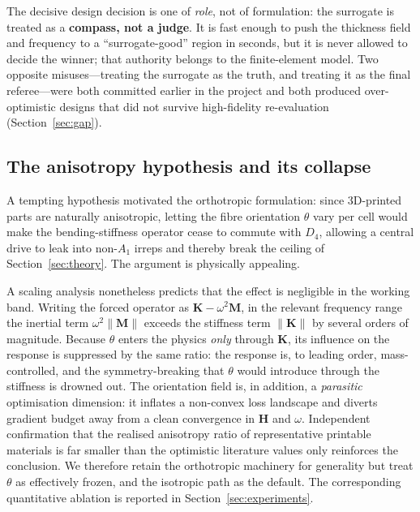 \documentclass[11pt,a4paper]{article}
\newcommand{\Aone}{A_1}
\newcommand{\Dfour}{D_4}
\newcommand{\matH}{\mathbf{H}}
\newcommand{\matK}{\mathbf{K}}
\newcommand{\matM}{\mathbf{M}}
\begin{document}
The decisive design decision is one of \emph{role}, not of formulation: the
surrogate is treated as a \textbf{compass, not a judge}. It is fast enough to push
the thickness field and frequency to a ``surrogate-good'' region in seconds, but
it is never allowed to decide the winner; that authority belongs to the
finite-element model. Two opposite misuses---treating the surrogate as the truth,
and treating it as the final referee---were both committed earlier in the project
and both produced over-optimistic designs that did not survive high-fidelity
re-evaluation (Section~\ref{sec:gap}).

\subsection{The anisotropy hypothesis and its collapse}\label{sec:aniso}
A tempting hypothesis motivated the orthotropic formulation: since 3D-printed
parts are naturally anisotropic, letting the fibre orientation $\theta$ vary per
cell would make the bending-stiffness operator cease to commute with $\Dfour$,
allowing a central drive to leak into non-$\Aone$ irreps and thereby break the
ceiling of Section~\ref{sec:theory}. The argument is physically appealing.

A scaling analysis nonetheless predicts that the effect is negligible in the
working band. Writing the forced operator as $\matK-\omega^2\matM$, in the
relevant frequency range the inertial term $\omega^2\lVert\matM\rVert$ exceeds the
stiffness term $\lVert\matK\rVert$ by several orders of magnitude. Because
$\theta$ enters the physics \emph{only} through $\matK$, its influence on the
response is suppressed by the same ratio: the response is, to leading order,
mass-controlled, and the symmetry-breaking that $\theta$ would introduce through
the stiffness is drowned out. The orientation field is, in addition, a
\emph{parasitic} optimisation dimension: it inflates a non-convex loss landscape
and diverts gradient budget away from a clean convergence in $\matH$ and $\omega$.
Independent confirmation that the realised anisotropy ratio of representative
printable materials is far smaller than the optimistic literature values only
reinforces the conclusion. We therefore retain the orthotropic machinery for
generality but treat $\theta$ as effectively frozen, and the isotropic path as the
default. The corresponding quantitative ablation is reported in
Section~\ref{sec:experiments}.
\end{document}
